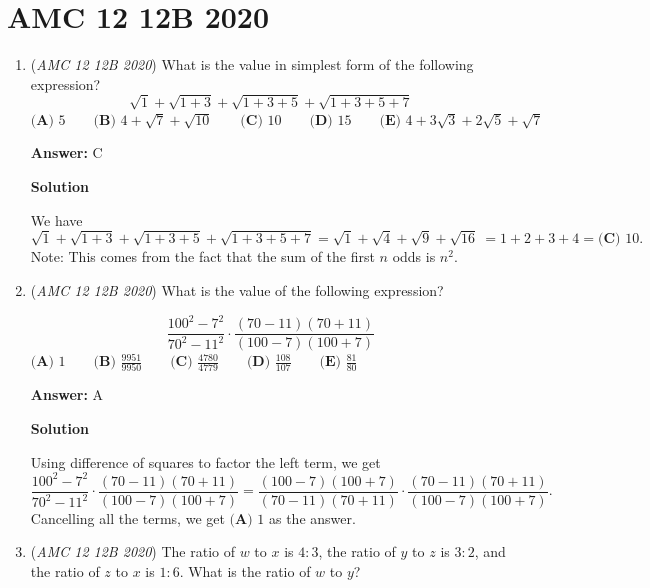 \section{AMC 12 12B 2020}
        \begin{enumerate}
        	\item (\textit{AMC 12 12B 2020}) What is the value in simplest form of the following expression?
 \[\sqrt{1} + \sqrt{1+3} + \sqrt{1+3+5} + \sqrt{1+3+5+7}\]
$\textbf{(A) }5 \qquad \textbf{(B) }4 + \sqrt{7} + \sqrt{10} \qquad \textbf{(C) } 10 \qquad \textbf{(D) } 15 \qquad \textbf{(E) } 4 + 3\sqrt{3} + 2\sqrt{5} + \sqrt{7}$

 \textbf{Answer: }C



\textbf{Solution}

We have 
 \[\sqrt{1} + \sqrt{1+3} + \sqrt{1+3+5} + \sqrt{1+3+5+7} = \sqrt{1} + \sqrt{4} + \sqrt{9} + \sqrt{16}\ = 1 + 2 + 3 + 4 = \boxed{\textbf{(C) } 10}.\]Note: This comes from the fact that the sum of the first $n$ odds is $n^2$.

 


 


 


 


	\item (\textit{AMC 12 12B 2020}) What is the value of the following expression?

 \[\frac{100^2-7^2}{70^2-11^2} \cdot \frac{(70-11)(70+11)}{(100-7)(100+7)}\]$\textbf{(A) } 1 \qquad \textbf{(B) } \frac{9951}{9950} \qquad \textbf{(C) } \frac{4780}{4779} \qquad \textbf{(D) } \frac{108}{107} \qquad \textbf{(E) } \frac{81}{80}$

 \textbf{Answer: }A



\textbf{Solution}

Using difference of squares to factor the left term, we get
 \[\frac{100^2-7^2}{70^2-11^2} \cdot \frac{(70-11)(70+11)}{(100-7)(100+7)} = \frac{(100-7)(100+7)}{(70-11)(70+11)} \cdot \frac{(70-11)(70+11)}{(100-7)(100+7)}.\]Cancelling all the terms, we get $\boxed{\textbf{(A) } 1}$ as the answer.

 


 


 


 


	\item (\textit{AMC 12 12B 2020}) The ratio of $w$ to $x$ is $4 : 3$, the ratio of $y$ to $z$ is $3 : 2$, and the ratio of $z$ to $x$ is $1 : 6$. What is the ratio of $w$ to $y$?



\end{enumerate}

